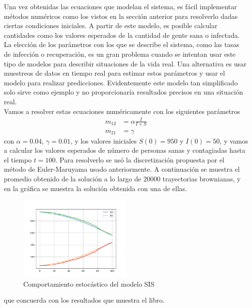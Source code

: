 \documentclass{article}
\begin{document}
\noindent
Una vez obtenidas las ecuaciones que modelan el sistema, es fácil implementar métodos numéricos como los vistos en la sección anterior para resolverlo dadas ciertas condiciones iniciales. A partir de este modelo, es posible calcular cantidades como los valores esperados de la cantidad de gente sana o infectada.\\

\noindent
La elección de los parámetros con los que se describe el sistema, como las tasas de infección o recuperación, es un gran problema cuando se intentan usar este tipo de modelos para describir situaciones de la vida real. Una alternativa es usar muestreos de datos en tiempo real para estimar estos parámetros y usar el modelo para realizar predicciones. Evidentemente este modelo tan simplificado solo sirve como ejemplo y no proporcionaría resultados precisos en una situación real.\\

\noindent 
Vamos a resolver estas ecuaciones numéricamente con los siguientes parámetros 
\begin{equation*}
\begin{split}
        m_{12}&=\alpha \frac{I}{I+S}\\
        m_{21}&=\gamma
\end{split}
\end{equation*}
con $\alpha=0.04$, $\gamma=0.01$, y los valores iniciales $S(0)=950$ y $I(0)=50$, y vamos a calcular los valores esperados de número de personas sanas y contagiadas hasta el tiempo $t=100$. Para resolverlo se usó la discretización propuesta por el método de Euler-Maruyama usado anteriormente. A continuación se muestra el promedio obtenido de la solución a lo largo de 20000 trayectorias brownianas, y en la gráfica se muestra la solución obtenida con una de ellas.
\begin{figure}[H]
    \centering
    \includegraphics[width=0.5\textwidth]{SimulacionEpide.png}
    \caption{Comportamiento estocástico del modelo SIS}
    \label{fig:my_label}
\end{figure}
que concuerda con los resultados que muestra el libro.




\end{document}
